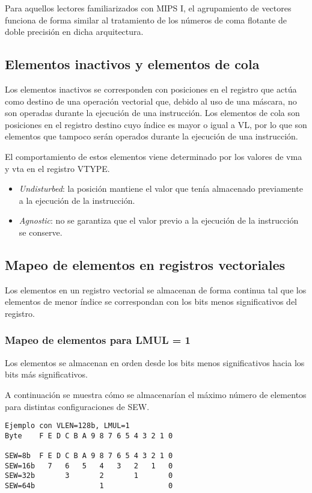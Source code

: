 Para aquellos lectores familiarizados con MIPS I, el agrupamiento de vectores funciona de forma similar al tratamiento de los números de coma flotante de doble precisión en dicha arquitectura.


\subsection{Elementos inactivos y elementos de cola}\label{masked-and-tail-elements}
Los elementos inactivos se corresponden con posiciones en el registro que actúa como destino de una operación vectorial que, debido al uso de una máscara, no son operadas durante la ejecución de una instrucción. Los elementos de cola son posiciones en el registro destino cuyo índice es mayor o igual a VL, por lo que son elementos que tampoco serán operados durante la ejecución de una instrucción.

El comportamiento de estos elementos viene determinado por los valores de vma y vta en el registro VTYPE.
\begin{itemize}
    \item \textit{Undisturbed}: la posición mantiene el valor que tenía almacenado previamente a la ejecución de la instrucción.
    \item \textit{Agnostic}: no se garantiza que el valor previo a la ejecución de la instrucción se conserve.
\end{itemize}

\subsection{Mapeo de elementos en registros vectoriales}\label{subsec:mapping-vector-elements}

Los elementos en un registro vectorial se almacenan de forma continua tal que
los elementos de menor índice se correspondan con los bits menos significativos
del registro.

\subsubsection{Mapeo de elementos para LMUL = 1}
Los elementos se almacenan en orden desde los bits menos significativos hacia
los bits más significativos.

A continuación se muestra cómo se almacenarían el máximo número de elementos
para distintas configuraciones de SEW.

\begin{lstlisting}
Ejemplo con VLEN=128b, LMUL=1
Byte    F E D C B A 9 8 7 6 5 4 3 2 1 0

SEW=8b  F E D C B A 9 8 7 6 5 4 3 2 1 0
SEW=16b   7   6   5   4   3   2   1   0
SEW=32b       3       2       1       0
SEW=64b               1               0
\end{lstlisting}

